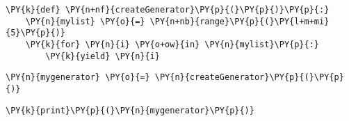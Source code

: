 
{\par%
\vspace{-1\baselineskip}%
}%
\begin{notebookcell}[6]%
\begin{addmargin}[\cellleftmargin]{0em}%
{\smaller%
\par%
%
\vspace{-1\smallerfontscale}%
\begin{Verbatim}[commandchars=\\\{\}]
\PY{k}{def} \PY{n+nf}{createGenerator}\PY{p}{(}\PY{p}{)}\PY{p}{:}
    \PY{n}{mylist} \PY{o}{=} \PY{n+nb}{range}\PY{p}{(}\PY{l+m+mi}{5}\PY{p}{)}
    \PY{k}{for} \PY{n}{i} \PY{o+ow}{in} \PY{n}{mylist}\PY{p}{:}
        \PY{k}{yield} \PY{n}{i}
\end{Verbatim}
%
\par%
\vspace{-1\smallerfontscale}}%
\end{addmargin}
\end{notebookcell}



{\par%
\vspace{-1\baselineskip}%
}%
\begin{notebookcell}[7]%
\begin{addmargin}[\cellleftmargin]{0em}%
{\smaller%
\par%
%
\vspace{-1\smallerfontscale}%
\begin{Verbatim}[commandchars=\\\{\}]
\PY{n}{mygenerator} \PY{o}{=} \PY{n}{createGenerator}\PY{p}{(}\PY{p}{)}
\end{Verbatim}
%
\par%
\vspace{-1\smallerfontscale}}%
\end{addmargin}
\end{notebookcell}



{\par%
\vspace{-1\baselineskip}%
}%
\begin{notebookcell}[8]%
\begin{addmargin}[\cellleftmargin]{0em}%
{\smaller%
\par%
%
\vspace{-1\smallerfontscale}%
\begin{Verbatim}[commandchars=\\\{\}]
\PY{k}{print}\PY{p}{(}\PY{n}{mygenerator}\PY{p}{)}
\end{Verbatim}
%
\par%
\vspace{-1\smallerfontscale}}%
\end{addmargin}
\end{notebookcell}

